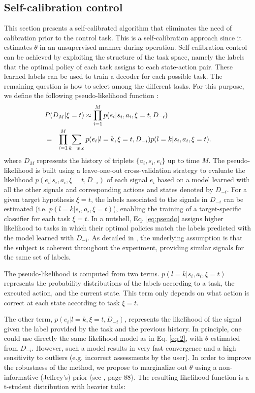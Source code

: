 \documentclass[10pt,letterpaper]{article}
\begin{document}
\subsection{Self-calibration control}
\label{sec:zerocalibration}
%
This section presents a self-calibrated algorithm that eliminates the need of  calibration prior to the control task. This is a self-calibration approach since it estimates $\theta$ in an unsupervised manner during operation.
%
Self-calibration control can be achieved by exploiting the structure of the task space, namely the  labels that the optimal policy of each task assigns to each state-action pair. These learned labels can be used to train a decoder for each possible task. The remaining question is how to select among the different tasks. For this purpose, we define the following pseudo-likelihood function \cite{grizou2014interactive}:
%
\begin{eqnarray}\label{eq:pseudo1}
	\lefteqn{P(D_M | \xi=t) \approx \prod_{i=1}^M p(e_i | s_i, a_i, \xi=t, D_{-i})}  \\ \label{eq:pseudo2}
	&=& \prod_{i=1}^M \sum_{k=w,c}  p(e_i | l=k, \xi=t, D_{-i})  p(l=k | s_i,a_i, \xi=t).
	\label{eq:pseudo}
\end{eqnarray}
%
where $D_M$ represents the history of triplets $\{a_i, s_i, e_i\}$ up to time $M$.
The pseudo-likelihood is built using a leave-one-out cross-validation strategy to evaluate the likelihood $p(e_i | s_i, a_i, \xi=t, D_{-i})$ of each signal $e_i$ based on a model learned with all the other signals and corresponding actions and states denoted by $D_{-i}$. For a given target hypothesis $\xi=t$, the labels associated to the signals in $D_{-i}$ can be estimated (i.e. $p(l=k | s_i,a_i, \xi=t)$), enabling the training of a target-specific classifier for each task $\xi=t$. In a nutshell, Eq. \ref{eq:pseudo} assigns higher likelihood to tasks in which their optimal policies match the labels predicted with the model learned with $D_{-i}$. As detailed in \cite{grizou2014interactive}, the underlying assumption is that the subject is coherent throughout the experiment, providing similar signals for the same set of labels.

The pseudo-likelihood is computed from two terms. $p(l=k|s_i,a_i,\xi=t)$ represents the probability distributions of the labels according to a task, the executed action, and the current state. This term only depends on what action is correct at each state according to task $\xi=t$.   

The other term, $p(e_i | l=k,\xi=t, D_{-i})$, represents the likelihood of the signal given the label provided by the task and the previous history. In principle, one could use directly the same likelihood model as in Eq. \ref{eq:2}, with $\theta$ estimated from $D_{-i}$. However, such a model results in very fast convergence and a high sensitivity to outliers (e.g. incorrect assessments by the user). In order to improve the robustness of the method, we propose to marginalize out $\theta$  using a non-informative (Jeffrey's) prior (see \cite{gelman2003bayesian}, page 88). The resulting likelihood function is a t-student distribution with heavier tails:
\end{document}
